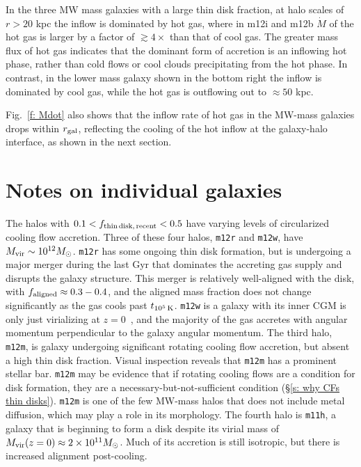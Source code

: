 \documentclass[fleqn,usenatbib]{mnras}
\newcommand{\tcon}{t_{10^5\,{\rm K}}}
\newcommand{\Mdot}{\dot{M}}
\begin{document}
In the three MW mass galaxies with a large thin disk fraction, at halo scales of $r>20$ kpc the inflow is dominated by hot gas, where in m12i and m12b $\Mdot$ of the hot gas is larger by a factor of $\gtrsim 4\times$ than that of cool gas. The greater mass flux of hot gas indicates that the dominant form of accretion is an inflowing hot phase, rather than cold flows or cool clouds precipitating from the hot phase.
In contrast, in the lower mass galaxy shown in the bottom right the inflow is dominated by cool gas, while the hot gas is outflowing out to $\approx50$ kpc.

Fig.~\ref{f: Mdot} also shows that the inflow rate of hot gas in the MW-mass galaxies drops within $r_{\rm gal}$, reflecting the cooling of the hot inflow at the galaxy-halo interface, as shown in the next section.


\section{Notes on individual galaxies}

\label{s: appendix-individual}

The halos with $0.1 < f_{\rm thin\,disk,\,recent} < 0.5$ have varying levels of circularized cooling flow accretion.
Three of these four halos, \texttt{m12r} and \texttt{m12w}, have $M_{\rm vir} \sim 10^{12} M_\odot$.
\texttt{m12r} has some ongoing thin disk formation, but is undergoing a major merger during the last Gyr that dominates the accreting gas supply and disrupts the galaxy structure.
This merger is relatively well-aligned with the disk, with $f_{\rm aligned} \approx 0.3-0.4$, and the aligned mass fraction does not change significantly as the gas cools past $\tcon$.
\texttt{m12w} is a galaxy with its inner CGM is only just virializing at $z=0$~\citep{Yu2021}, and the majority of the gas accretes with angular momentum perpendicular to the galaxy angular momentum.
The third halo, \texttt{m12m}, is galaxy undergoing significant rotating cooling flow accretion, but absent a high thin disk fraction.
Visual inspection reveals that \texttt{m12m} has a prominent stellar bar.
\texttt{m12m} may be evidence that if rotating cooling flows are a condition for disk formation, they are a necessary-but-not-sufficient condition (\S\ref{s: why CFs thin disks}).
\texttt{m12m} is one of the few MW-mass halos that does not include metal diffusion, which may play a role in its morphology.
The fourth halo is \texttt{m11h}, a galaxy that is beginning to form a disk despite its virial mass of $M_{\rm vir}(z=0) \approx 2 \times 10^{11} M_\odot$.
Much of its accretion is still isotropic, but there is increased alignment post-cooling.
\end{document}
